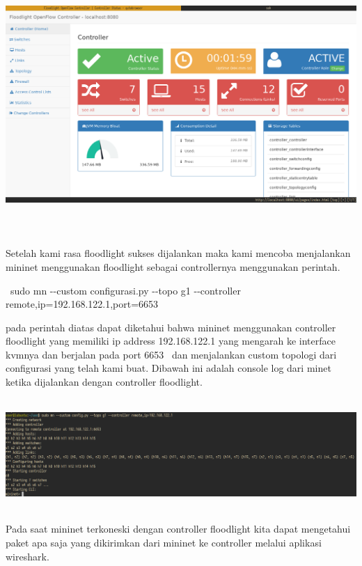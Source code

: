 \begin{center}
\includegraphics[width=6.9252in,height=3.8827in]{gambar/flhome.png}
\end{center}
Setelah kami rasa floodlight sukses dijalankan maka kami mencoba menjalankan mininet menggunakan floodlight sebagai
controllernya menggunakan perintah.

\bigskip

{\centering
\ sudo mn -{}-custom configurasi.py -{}-topo g1 -{}-controller remote,ip=192.168.122.1,port=6653
\par}

\bigskip

pada perintah diatas dapat diketahui bahwa mininet menggunakan controller floodlight yang memiliki ip address
192.168.122.1 yang mengarah ke interface kvmnya dan berjalan pada port 6653 \ dan menjalankan custom topologi dari
configurasi yang telah kami buat. Dibawah ini adalah console log dari minet ketika dijalankan dengan controller
floodlight.


\begin{center}
\includegraphics[width=6.9252in,height=1.6575in]{gambar/mininetlog.png}
\end{center}
Pada saat mininet terkoneski dengan controller floodlight kita dapat mengetahui paket apa saja yang dikirimkan dari
mininet ke controller melalui aplikasi wireshark. 


